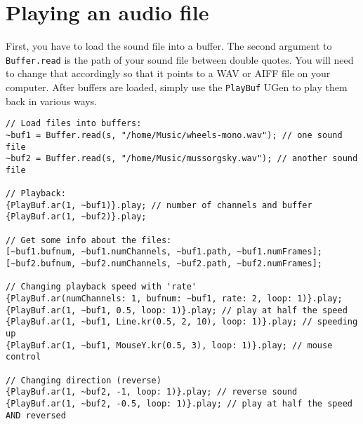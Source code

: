 \section{Playing an audio file}

First, you have to load the sound file into a buffer. The second argument to \texttt{Buffer.read} is the path of your sound file between double quotes. You will need to change that accordingly so that it points to a WAV or AIFF file on your computer. After buffers are loaded, simply use the \texttt{PlayBuf} UGen to play them back in various ways.

\bigskip
{}
\bigskip

\begin{lstlisting}[style=SuperCollider-IDE, basicstyle=\scttfamily\footnotesize]
// Load files into buffers:
~buf1 = Buffer.read(s, "/home/Music/wheels-mono.wav"); // one sound file
~buf2 = Buffer.read(s, "/home/Music/mussorgsky.wav"); // another sound file

// Playback:
{PlayBuf.ar(1, ~buf1)}.play; // number of channels and buffer
{PlayBuf.ar(1, ~buf2)}.play;

// Get some info about the files:
[~buf1.bufnum, ~buf1.numChannels, ~buf1.path, ~buf1.numFrames];
[~buf2.bufnum, ~buf2.numChannels, ~buf2.path, ~buf2.numFrames];

// Changing playback speed with 'rate'
{PlayBuf.ar(numChannels: 1, bufnum: ~buf1, rate: 2, loop: 1)}.play;
{PlayBuf.ar(1, ~buf1, 0.5, loop: 1)}.play; // play at half the speed
{PlayBuf.ar(1, ~buf1, Line.kr(0.5, 2, 10), loop: 1)}.play; // speeding up
{PlayBuf.ar(1, ~buf1, MouseY.kr(0.5, 3), loop: 1)}.play; // mouse control

// Changing direction (reverse)
{PlayBuf.ar(1, ~buf2, -1, loop: 1)}.play; // reverse sound
{PlayBuf.ar(1, ~buf2, -0.5, loop: 1)}.play; // play at half the speed AND reversed
\end{lstlisting}
